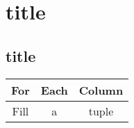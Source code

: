 \documentclass[12pt,a4paper]{report}
\begin{document}
	\begin{titlepage}
		\clearpage
	\end{titlepage}

\abstract{}

	\tableofcontents
	\doublespacing

	\clearpage
	
	\section{title}
	\subsection{title}
	
	\begin{table}[H]
	    \begin{tabular}{|c|c|c|}
	    \hline
	    For & Each & Column \\ \hline
	    Fill & a & tuple \\ \hline
	    \end{tabular}
	\end{table}
	
	
	
\end{document}
